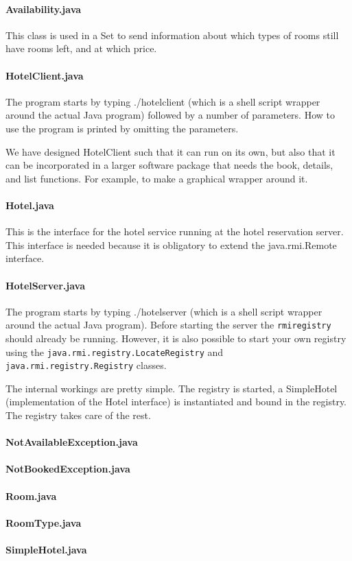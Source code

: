 \documentclass[a4paper,10pt]{article}
\begin{document}
\paragraph{Availability.java}
This class is used in a Set to send information about which types of rooms still have rooms left, and at which price.

\paragraph{HotelClient.java}
The program starts by typing ./hotelclient (which is a shell script wrapper around the actual Java program) followed by a number of parameters. How to use the program is printed by omitting the parameters.

We have designed HotelClient such that it can run on its own, but also that it can be incorporated in a larger software package that needs the book, details, and list functions. For example, to make a graphical wrapper around it.

\paragraph{Hotel.java}
This is the interface for the hotel service running at the hotel reservation server. This interface is needed because it is obligatory to extend the java.rmi.Remote interface.
 
\paragraph{HotelServer.java}
The program starts by typing ./hotelserver (which is a shell script wrapper around the actual Java program). Before starting the server the \texttt{rmiregistry} should already be running. However, it is also possible to start your own registry using the \texttt{java.rmi.registry.LocateRegistry} and \texttt{java.rmi.registry.Registry} classes.

The internal workings are pretty simple. The registry is started, a SimpleHotel (implementation of the Hotel interface) is instantiated and bound in the registry. The registry takes care of the rest. 

\paragraph{NotAvailableException.java}
\paragraph{NotBookedException.java}
\paragraph{Room.java}
\paragraph{RoomType.java}
\paragraph{SimpleHotel.java}
\end{document}
